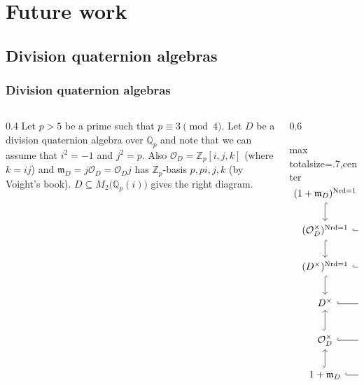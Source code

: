 \documentclass{beamer}
\newcommand*\Z{\mathbb{Z}}
\newcommand*\Q{\mathbb{Q}}
\DeclareMathOperator{\GL}{GL} %
\DeclareMathOperator{\SL}{SL} %
\DeclareMathOperator{\Nrd}{Nrd}
\newcommand*\sO{\mathcal{O}}
\newcommand*\idm{\mathfrak{m}}
\begin{document}
\section{Future work}

\subsection{Division quaternion algebras}

\begin{frame}[fragile]
  \frametitle{Division quaternion algebras}

  \begin{columns}
    \begin{column}{0.4\textwidth}
      Let $p>5$ be a prime such that $p \equiv 3 \pmod{4}$. Let $D$ be a division quaternion algebra over $\Q_{p}$ and note that we can assume that $i^{2} = -1$ and $j^{2} = p$. Also $\sO_{D} = \Z_{p}[i,j,k]$ (where $k = ij$) and $\idm_{D} = j\sO_{D} = \sO_{D}j$ has $\Z_{p}$-basis $p,pi,j,k$ (by Voight's book). $D \subseteq M_{2}\bigl( \Q_{p}(i) \bigr)$ gives the right diagram.
    \end{column}
    \begin{column}{0.6\textwidth}
      \begin{adjustbox}{max totalsize={\textwidth}{.7\textheight},center}
        \begingroup
        $\begin{tikzcd}
          (1+\idm_{D})^{\Nrd = 1} \ar[d, hook] \ar[r, hook] & I_{\SL_{2}(\Q_{p}(i))} \ar[d, hook] & \ar[l, hook'] I_{\SL_{2}(\Q_{p})} \ar[d, hook] \\
          (\sO_{D}^{\times})^{\Nrd = 1} \ar[d, hook] \ar[r, hook] & \SL_{2}\bigl( \Z_{p}[i] \bigr) \ar[d, hook] & \ar[l, hook'] \SL_{2}(\Z_{p}) \ar[d, hook] \\
          (D^{\times})^{\Nrd = 1} \ar[d, hook] \ar[r, hook] & \SL_{2}\bigl( \Q_{p}(i) \bigr) \ar[d, hook] & \ar[l, hook'] \SL_{2}(\Q_{p}) \ar[d, hook] \\
          D^{\times} \ar[r, hook] & \GL_{2}\bigl( \Q_{p}(i) \bigr) & \ar[l, hook'] \GL_{2}(\Q_{p}) \\
          \sO_{D}^{\times} \ar[u, hook] \ar[r, hook] & \GL_{2}\bigl( \Z_{p}[i] \bigr) \ar[u, hook] & \ar[l, hook'] \GL_{2}(\Z_{p}) \ar[u, hook] \\
          1+\idm_{D} \ar[u, hook] \ar[r, hook] & I_{\GL_{2}(\Q_{p}(i))} \ar[u, hook] & \ar[l, hook'] I_{\GL_{2}(\Q_{p})}. \ar[u, hook]
        \end{tikzcd}$
        \endgroup
      \end{adjustbox}
    \end{column}
  \end{columns}
\end{frame}
\end{document}
